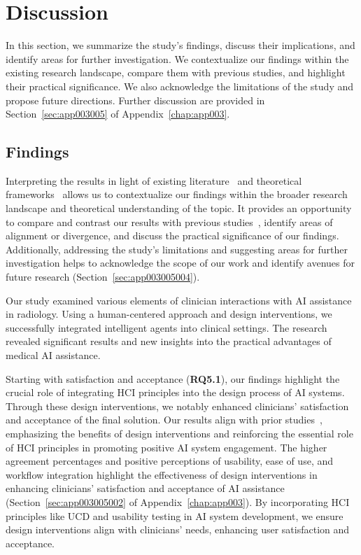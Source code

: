 \section{Discussion}
\label{sec:chap005007}

In this section, we summarize the study's findings, discuss their implications, and identify areas for further investigation.
We contextualize our findings within the existing research landscape, compare them with previous studies, and highlight their practical significance.
We also acknowledge the limitations of the study and propose future directions.
Further discussion are provided in Section~\ref{sec:app003005} of Appendix~\ref{chap:app003}.

\subsection{Findings}
\label{sec:chap005007001}

Interpreting the results in light of existing literature~\cite{10.1145/3411764.3445432} and theoretical frameworks~\cite{10.1145/3311957.3361858} allows us to contextualize our findings within the broader research landscape and theoretical understanding of the topic.
It provides an opportunity to compare and contrast our results with previous studies~\cite{CALISTO2022102285, CALISTO2021102607}, identify areas of alignment or divergence, and discuss the practical significance of our findings.
Additionally, addressing the study's limitations and suggesting areas for further investigation helps to acknowledge the scope of our work and identify avenues for future research (Section~\ref{sec:app003005004}).

Our study examined various elements of clinician interactions with \ac{AI} assistance in radiology.
Using a human-centered approach and design interventions, we successfully integrated intelligent agents into clinical settings.
The research revealed significant results and new insights into the practical advantages of medical \ac{AI} assistance.

Starting with satisfaction and acceptance ({\bf RQ5.1}), our findings highlight the crucial role of integrating \ac{HCI} principles into the design process of \ac{AI} systems.
Through these design interventions, we notably enhanced clinicians' satisfaction and acceptance of the final solution.
Our results align with prior studies~\cite{10.1145/3411764.3445432}, emphasizing the benefits of design interventions and reinforcing the essential role of \ac{HCI} principles in promoting positive \ac{AI} system engagement.
The higher agreement percentages and positive perceptions of usability, ease of use, and workflow integration highlight the effectiveness of design interventions in enhancing clinicians' satisfaction and acceptance of \ac{AI} assistance (Section~\ref{sec:app003005002} of Appendix~\ref{chap:app003}).
By incorporating \ac{HCI} principles like \ac{UCD} and usability testing in \ac{AI} system development, we ensure design interventions align with clinicians' needs, enhancing user satisfaction and acceptance.

